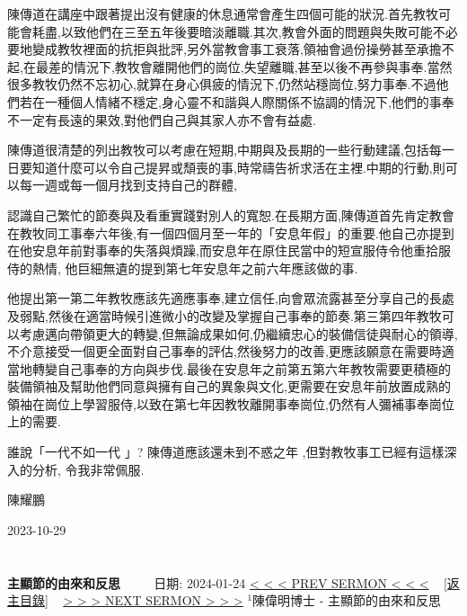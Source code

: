\documentclass{book}
\begin{document}
陳傳道在講座中跟著提出沒有健康的休息通常會產生四個可能的狀況.首先教牧可能會耗盡,以致他們在三至五年後要暗淡離職.其次,教會外面的問題與失敗可能不必要地變成教牧裡面的抗拒與批評,另外當教會事工衰落,領袖會過份操勞甚至承擔不起,在最差的情況下,教牧會離開他們的崗位,失望離職,甚至以後不再參與事奉.當然很多教牧仍然不忘初心,就算在身心俱疲的情況下,仍然站穩崗位,努力事奉.不過他們若在一種個人情緒不穩定,身心靈不和諧與人際關係不協調的情況下,他們的事奉不一定有長遠的果效,對他們自己與其家人亦不會有益處.

陳傳道很清楚的列出教牧可以考慮在短期,中期與及長期的一些行動建議,包括每一日要知道什麼可以令自己提昇或頹喪的事,時常禱告祈求活在主裡.中期的行動,則可以每一週或每一個月找到支持自己的群體,

認識自己繁忙的節奏與及看重實踐對別人的寬恕.在長期方面,陳傳道首先肯定教會在教牧同工事奉六年後,有一個四個月至一年的「安息年假」的重要.他自己亦提到在他安息年前對事奉的失落與煩躁,而安息年在原住民當中的短宣服侍令他重拾服侍的熱情, 他巨細無遺的提到第七年安息年之前六年應該做的事.

他提出第一第二年教牧應該先適應事奉,建立信任,向會眾流露甚至分享自己的長處及弱點,然後在適當時候引進微小的改變及掌握自己事奉的節奏.第三第四年教牧可以考慮邁向帶領更大的轉變,但無論成果如何,仍繼續忠心的裝備信徒與耐心的領導,不介意接受一個更全面對自己事奉的評估,然後努力的改善,更應該願意在需要時適當地轉變自己事奉的方向與步伐.最後在安息年之前第五第六年教牧需要更積極的裝備領袖及幫助他們同意與擁有自己的異象與文化,更需要在安息年前放置成熟的領袖在崗位上學習服侍,以致在第七年因教牧離開事奉崗位,仍然有人彌補事奉崗位上的需要.

誰說「一代不如一代 」? 陳傳道應該還未到不惑之年 ,但對教牧事工已經有這樣深入的分析, 令我非常佩服.

陳耀鵬

2023-10-29
\newpage



\section{}
\label{sec:8}
\textbf{主顯節的由來和反思}
\newline
\newline
~~~~ 日期: 2024-01-24
\newline
\newline
\hyperref[sec:7]{\small{< < < PREV SERMON < < <}}
~
\hyperref[sec:index]{\small{[返主目錄]}}
~
\hyperref[sec:9]{\small{> > > NEXT SERMON > > >}}
\newline
\newline
$^{1}$陳偉明博士 - 主顯節的由來和反思
\end{document}
